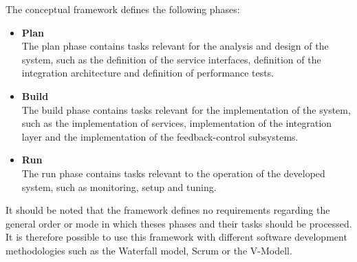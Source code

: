 The conceptual framework defines the following phases:
\begin{itemize}
	\item \textbf{Plan}\\
	The plan phase contains tasks relevant for the analysis and design of the system, such as the definition of the service interfaces, definition of the integration architecture and definition of performance tests.
	\item \textbf{Build}\\
	The build phase contains tasks relevant for the implementation of the system, such as the implementation of services, implementation of the integration layer and the implementation of the feedback-control subsystems.
	\item \textbf{Run}\\
	The run phase contains tasks relevant to the operation of the developed system, such as monitoring, setup and tuning.
\end{itemize}

It should be noted that the framework defines no requirements regarding the general order or mode in which theses phases and their tasks should be processed. It is therefore possible to use this framework with different software development methodologies such as the Waterfall model, Scrum or the V-Modell.

